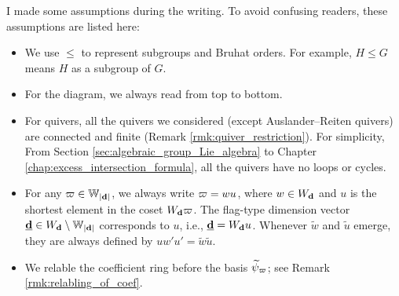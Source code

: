 

\maketitle
\tableofcontents

\begin{warning}
I made some assumptions during the writing. To avoid confusing readers, these assumptions are listed here:
\begin{itemize}
\item We use $\leqslant$ to represent subgroups and Bruhat orders. For example, $H \leqslant G$ means $H$ as a subgroup of $G$.

\item For the diagram, we always read from top to bottom.

\item For quivers, all the quivers we considered (except Auslander--Reiten quivers) are connected and finite (Remark \ref{rmk:quiver_restriction}). For simplicity, From Section \ref{sec:algebraic_group_Lie_algebra} to Chapter \ref{chap:excess_intersection_formula}, all the quivers have no loops or cycles.

\item  For any $\varpi \in \mathbb{W}_{|\mathbf{d}|}$, we always write $\varpi = wu$, where $w \in W_{\mathbf{d}}$ and $u$ is the shortest element in the coset $W_{\mathbf{d}} \varpi$. The flag-type dimension vector $\underline{\mathbf{d}} \in W_{\mathbf{d}} \setminus \mathbb{W}_{|\mathbf{d}|}$ corresponds to $u$, i.e., $\underline{\mathbf{d}}=W_{\mathbf{d}} u$. Whenever $\tilde{w}$ and $\tilde{u}$ emerge, they are always defined by $uw'u'=\tilde{w}\tilde{u}$.

\item We relable the coefficient ring before the basis $\widetilde{\psi}_{\varpi}$; see Remark \ref{rmk:relabling_of_coef}.
\end{itemize}
\end{warning}